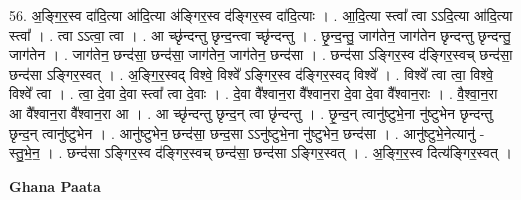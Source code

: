 \documentclass[17pt]{extarticle}
\begin{document}
56. अ॒ङ्गि॒र॒स्व दा॑दि॒त्या आ॑दि॒त्या अ॑ङ्गिर॒स्व द॑ङ्गिर॒स्व दा॑दि॒त्याः । . आ॒दि॒त्या स्त्वा᳚ त्वा ऽऽदि॒त्या आ॑दि॒त्या स्त्वा᳚ । . त्वा ऽऽत्वा॒ त्वा । . आ च्छृ॑न्दन्तु छृन्द॒न्त्वा च्छृ॑न्दन्तु । . छृ॒न्द॒न्तु॒ जाग॑तेन॒ जाग॑तेन छृन्दन्तु छृन्दन्तु॒ जाग॑तेन । . जाग॑तेन॒ छन्द॑सा॒ छन्द॑सा॒ जाग॑तेन॒ जाग॑तेन॒ छन्द॑सा । . छन्द॑सा ऽङ्गिर॒स्व द॑ङ्गिर॒स्वच् छन्द॑सा॒ छन्द॑सा ऽङ्गिर॒स्वत् । . अ॒ङ्गि॒र॒स्वद् विश्वे॒ विश्वे᳚ ऽङ्गिर॒स्व द॑ङ्गिर॒स्वद् विश्वे᳚ । . विश्वे᳚ त्वा त्वा॒ विश्वे॒ विश्वे᳚ त्वा । . त्वा॒ दे॒वा दे॒वा स्त्वा᳚ त्वा दे॒वाः । . दे॒वा वै᳚श्वान॒रा वै᳚श्वान॒रा दे॒वा दे॒वा वै᳚श्वान॒राः । . वै॒श्वा॒न॒रा आ वै᳚श्वान॒रा वै᳚श्वान॒रा आ । . आ च्छृ॑न्दन्तु छृन्द॒न् त्वा छृ॑न्दन्तु । . छृ॒न्द॒न् त्वानु॑ष्टुभे॒ना नु॑ष्टुभेन छृन्दन्तु छृन्द॒न् त्वानु॑ष्टुभेन । . आनु॑ष्टुभेन॒ छन्द॑सा॒ छन्द॒सा ऽऽनु॑ष्टुभे॒ना नु॑ष्टुभेन॒ छन्द॑सा । . आनु॑ष्टुभे॒नेत्यानु॑ - स्तु॒भे॒न॒ । . छन्द॑सा ऽङ्गिर॒स्व द॑ङ्गिर॒स्वच् छन्द॑सा॒ छन्द॑सा ऽङ्गिर॒स्वत् । . अ॒ङ्गि॒र॒स्व दित्य॑ङ्गिर॒स्वत् । \newline

\textbf{Ghana Paata } \newline
\end{document}
